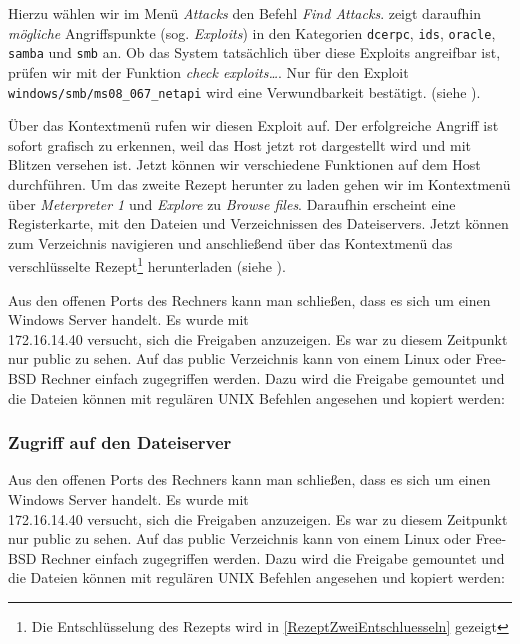 Hierzu wählen wir im Menü \emph{Attacks} den Befehl \emph{\glqq{}Find Attacks\grqq{}}. \Armitage{} zeigt daraufhin \emph{mögliche} Angriffspunkte (sog. \emph{Exploits}) in den Kategorien \texttt{dcerpc}, \texttt{ids}, \texttt{oracle}, \texttt{samba} und \texttt{smb} an. Ob das System tatsächlich über diese Exploits angreifbar ist, prüfen wir mit der Funktion \emph{\glqq{}check exploits\ldots\grqq{}}. Nur für den Exploit \texttt{windows/smb/ms08\_067\_netapi} wird eine Verwundbarkeit bestätigt. (siehe ).


Über das Kontextmenü rufen wir diesen Exploit auf. Der erfolgreiche Angriff ist sofort grafisch zu erkennen, weil das Host 
jetzt rot dargestellt wird und mit Blitzen versehen ist. Jetzt können wir verschiedene Funktionen auf dem Host durchführen.
Um das zweite Rezept herunter zu laden gehen wir im Kontextmenü über \emph{Meterpreter 1} und \emph{Explore} zu \emph{\glqq{}Browse files\grqq{}}. Daraufhin erscheint eine Registerkarte, mit den Dateien und Verzeichnissen des Dateiservers. Jetzt können zum Verzeichnis  navigieren und anschließend über das Kontextmenü das verschlüsselte Rezept\footnote{Die Entschlüsselung des Rezepts wird in \cref{RezeptZweiEntschluesseln} gezeigt} herunterladen (siehe ).


Aus den offenen Ports des Rechners  kann man
schließen, dass es sich um einen Windows Server handelt. Es wurde mit
\\172.16.14.40 versucht, sich die Freigaben anzuzeigen. Es war zu diesem
Zeitpunkt nur public zu sehen. Auf das public Verzeichnis kann von einem Linux
oder Free-BSD Rechner einfach zugegriffen werden. Dazu wird die Freigabe
\glqq{}gemountet\grqq{} und die Dateien können mit regulären UNIX Befehlen angesehen und
kopiert werden:

\subsubsection{Zugriff auf den Dateiserver}

Aus den offenen Ports des Rechners  kann man
schließen, dass es sich um einen Windows Server handelt. Es wurde mit
\\172.16.14.40 versucht, sich die Freigaben anzuzeigen. Es war zu diesem
Zeitpunkt nur public zu sehen. Auf das public Verzeichnis kann von einem Linux
oder Free-BSD Rechner einfach zugegriffen werden. Dazu wird die Freigabe
\glqq{}gemountet\grqq{} und die Dateien können mit regulären UNIX Befehlen angesehen und
kopiert werden:

